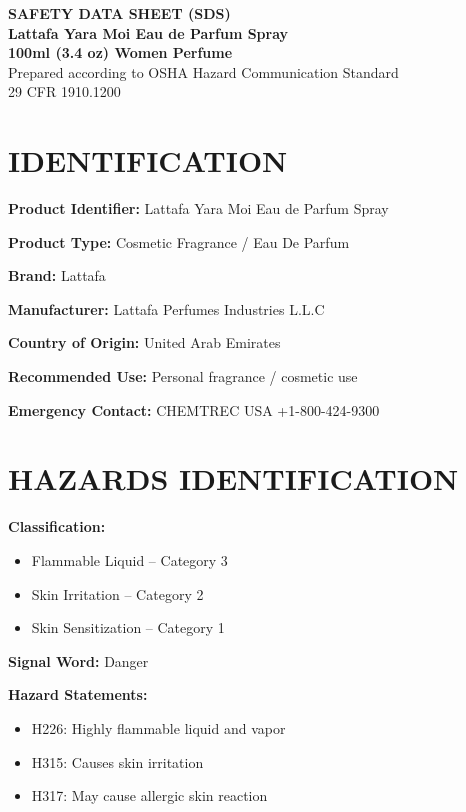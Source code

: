 \documentclass[11pt]{article}
\begin{document}
\begin{center}
{\LARGE \textbf{SAFETY DATA SHEET (SDS)}}\\[6pt]
{\Large \textbf{Lattafa Yara Moi Eau de Parfum Spray}}\\
{\large \textbf{100ml (3.4 oz) Women Perfume}}\\[6pt]
Prepared according to OSHA Hazard Communication Standard\\
29 CFR 1910.1200
\end{center}

\vspace{10pt}

\section{IDENTIFICATION}

\textbf{Product Identifier:} Lattafa Yara Moi Eau de Parfum Spray

\textbf{Product Type:} Cosmetic Fragrance / Eau De Parfum

\textbf{Brand:} Lattafa

\textbf{Manufacturer:} Lattafa Perfumes Industries L.L.C

\textbf{Country of Origin:} United Arab Emirates

\textbf{Recommended Use:} Personal fragrance / cosmetic use

\textbf{Emergency Contact:} CHEMTREC USA +1-800-424-9300

\section{HAZARDS IDENTIFICATION}

\textbf{Classification:}
\begin{itemize}[noitemsep]
    \item Flammable Liquid -- Category 3
    \item Skin Irritation -- Category 2
    \item Skin Sensitization -- Category 1
\end{itemize}

\textbf{Signal Word:} Danger

\textbf{Hazard Statements:}
\begin{itemize}[noitemsep]
    \item H226: Highly flammable liquid and vapor
    \item H315: Causes skin irritation
    \item H317: May cause allergic skin reaction
\end{itemize}
\end{document}

